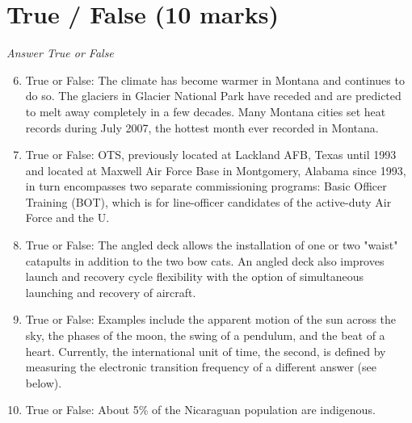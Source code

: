 \documentclass[12pt]{article}
\begin{document}
\section*{True / False (10 marks)}
\textit{Answer True or False}
\begin{enumerate}[label=\arabic*.]
\setcounter{enumi}{5}
\item True or False: The climate has become warmer in Montana and continues to do so. The glaciers in Glacier National Park have receded and are predicted to melt away completely in a few decades. Many Montana cities set heat records during July 2007, the hottest month ever recorded in Montana.
\item True or False: OTS, previously located at Lackland AFB, Texas until 1993 and located at Maxwell Air Force Base in Montgomery, Alabama since 1993, in turn encompasses two separate commissioning programs: Basic Officer Training (BOT), which is for line-officer candidates of the active-duty Air Force and the U.
\item True or False: The angled deck allows the installation of one or two "waist" catapults in addition to the two bow cats. An angled deck also improves launch and recovery cycle flexibility with the option of simultaneous launching and recovery of aircraft.
\item True or False: Examples include the apparent motion of the sun across the sky, the phases of the moon, the swing of a pendulum, and the beat of a heart. Currently, the international unit of time, the second, is defined by measuring the electronic transition frequency of a different answer (see below).
\item True or False: About 5\% of the Nicaraguan population are indigenous.
\end{enumerate}
\end{document}
